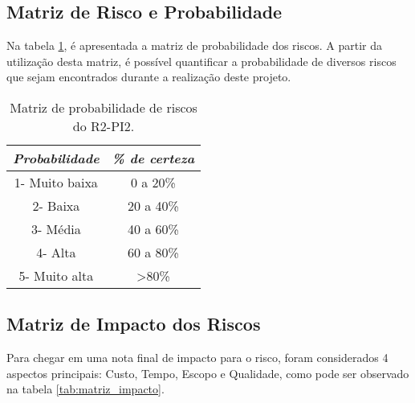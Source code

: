  \subsection{Matriz de Risco e Probabilidade} %
 \label{sub:matriz_de_risco_e_probabilidade}

 Na tabela \ref{tab:probabilidade}, é apresentada a matriz de probabilidade dos riscos. A partir da utilização desta matriz, é possível quantificar a probabilidade de diversos riscos que sejam encontrados durante a realização deste projeto.

 \begin{table}[H]
	\centering
	\caption{Matriz de probabilidade de riscos do R2-PI2.}
	\label{tab:probabilidade}
	\begin{tabular}{|c|c|}
		\hline
		\rowcolor[HTML]{C0C0C0} 
		\textit{\textbf{Probabilidade}} & \textit{\textbf{\% de certeza}} \\ \hline
		1- Muito baixa                  & 0 a 20\%                        \\ \hline
		2- Baixa                        & 20 a 40\%                       \\ \hline
		3- Média                        & 40 a 60\%                       \\ \hline
		4- Alta                         & 60 a 80\%                       \\ \hline
		5- Muito alta                   & \textgreater80\%                \\ \hline
	\end{tabular}
\end{table}
 
 \subsection{Matriz de Impacto dos Riscos} %
 \label{sub:matriz_de_impacto_dos_riscos}
 
 Para chegar em uma nota final de impacto para o risco, foram considerados 4 aspectos principais: Custo, Tempo, Escopo e Qualidade, como pode ser observado na tabela \ref{tab:matriz_impacto}.

